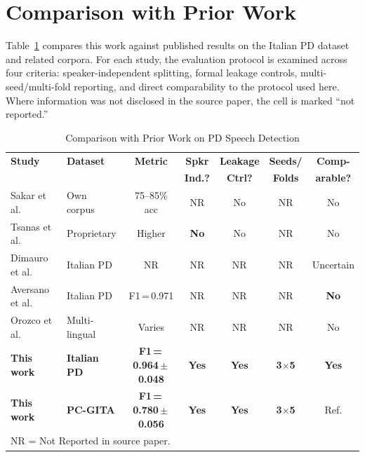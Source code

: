 \documentclass[oneside,openany]{final_report}
\begin{document}
\section{Comparison with Prior Work}

Table~\ref{tab:sota_comparison} compares this work against published results on the Italian PD dataset and related corpora. For each study, the evaluation protocol is examined across four criteria: speaker-independent splitting, formal leakage controls, multi-seed/multi-fold reporting, and direct comparability to the protocol used here. Where information was not disclosed in the source paper, the cell is marked ``not reported.''

\begin{table}[H]
\centering
\caption{Comparison with Prior Work on PD Speech Detection}
\label{tab:sota_comparison}
\small
\begin{tabularx}{\textwidth}{l l c c c c c}
\toprule
\textbf{Study} & \textbf{Dataset} & \textbf{Metric} & \textbf{Spkr} & \textbf{Leakage} & \textbf{Seeds/} & \textbf{Comp-} \\
 & & & \textbf{Ind.?} & \textbf{Ctrl?} & \textbf{Folds} & \textbf{arable?} \\
\midrule
Sakar et al.~\cite{sakar2013} & Own corpus & 75--85\% acc & NR & No & NR & No \\
Tsanas et al.~\cite{tsanas2012} & Proprietary & Higher & \textbf{No} & No & NR & No \\
Dimauro et al.~\cite{dimauro2019} & Italian PD & NR & NR & NR & NR & Uncertain \\
Aversano et al.~\cite{aversano2022} & Italian PD & F1\,=\,0.971 & NR & NR & NR & \textbf{No} \\
Orozco et al.~\cite{orozco2016} & Multi-lingual & Varies & NR & NR & NR & No \\
\midrule
\textbf{This work} & \textbf{Italian PD} & \textbf{F1\,=\,0.964\,$\pm$\,0.048} & \textbf{Yes} & \textbf{Yes} & \textbf{3$\times$5} & \textbf{Yes} \\
\textbf{This work} & \textbf{PC-GITA} & \textbf{F1\,=\,0.780\,$\pm$\,0.056} & \textbf{Yes} & \textbf{Yes} & \textbf{3$\times$5} & Ref. \\
\bottomrule
\multicolumn{7}{l}{\small NR = Not Reported in source paper.}
\end{tabularx}
\end{table}
\end{document}
